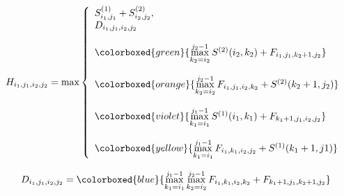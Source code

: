 \begin{equation}
\label{eqn:bpm_recurrence_h}
H_{i_{1},j_{1},i_{2},j_{2}} \\ = \max \left \{\begin{array}{lr}
                 S^{(1)}_{i_{1}, j_{1}}  + S^{(2)}_{i_{2}, j_{2}}, \\
                  D_{i_{1},j_{1},i_{2},j_{2}}\\
                  \\
                 \colorboxed{green}{\max\limits_{k_{2}=i_{2}}^{j_{2}-1} S^{(2)}(i_{2}, k_{2}) + F_{i_{1},j_{1}, k_{2}+1, j_{2}}}\\
                 \\
                 \colorboxed{orange}{{\max\limits_{k_{2}=i_{2}}^{j_{2}-1} F_{i_{1},j_{1}, i_{2}, k_{2}} + S^{(2)}(k_{2}+1, j_{2})}}\\
                 \\
                 \colorboxed{violet}{\max\limits_{k_{1}=i_{1}}^{j_{1}-1}  S^{(1)}(i_{1}, k_{1}) + F_{k_{1}+1,j_{1},i_{2}, j_{2}}}\\
                 \\
                 \colorboxed{yellow}{\max\limits_{k_{1}=i_{1}}^{j_{1}-1} F_{i_{1},k_{1}, i_{2}, j_{2}}+ S^{(1)}(k_{1}+1, j{1})} \\
               \end{array}
           \right. \\
\end{equation}

\begin{equation}
\label{eqn:bpm_recurrence_h_dmaxp1}
D_{i_{1},j_{1},i_{2},j_{2}} \\ = 
                 \colorboxed{blue}{\max\limits_{k_{1}=i_{1}}^{j_{1}-1} \max\limits_{k_{2}=i_{2}}^{j_{2}-1} F_{i_{1},k_{1}, i_{2}, k_{2}}+ F_{k_{1}+1,j_{1}, k_{2}+1, j_{2}}}\\
\end{equation}
